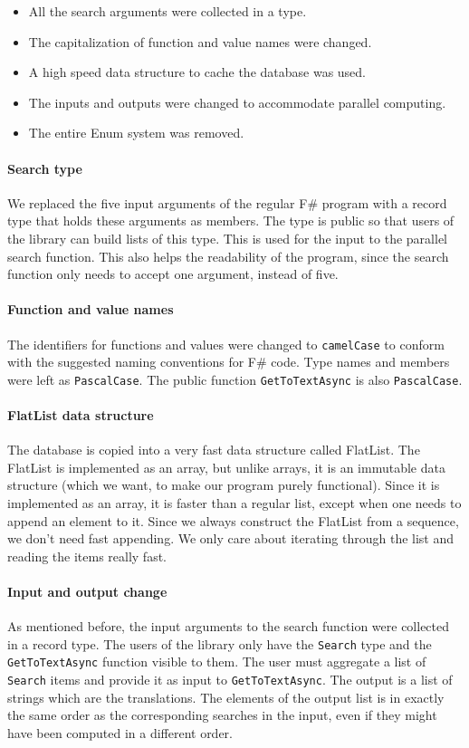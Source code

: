\documentclass[12pt, a4paper]{article}
\newcommand{\code}[1]{{\small \texttt{#1}}}
\begin{document}
\begin{itemize}
	\item All the search arguments were collected in a type.
	\item The capitalization of function and value names were changed.
	\item A high speed data structure to cache the database was used.
	\item The inputs and outputs were changed to accommodate parallel computing.
	\item The entire Enum system was removed.
\end{itemize}

\paragraph{Search type} We replaced the five input arguments of the regular F\# program with a record type that holds these arguments as members. The type is public so that users of the library can build lists of this type. This is used for the input to the parallel search function. This also helps the readability of the program, since the search function only needs to accept one argument, instead of five.

\paragraph{Function and value names} The identifiers for functions and values were changed to \code{camelCase} to conform with the suggested naming conventions for F\# code. Type names and members were left as \code{PascalCase}. The public function \code{GetToTextAsync} is also \code{PascalCase}.

\paragraph{FlatList data structure} The database is copied into a very fast data structure called FlatList. The FlatList is implemented as an array, but unlike arrays, it is an immutable data structure (which we want, to make our program purely functional). Since it is implemented as an array, it is faster than a regular list, except when one needs to append an element to it. Since we always construct the FlatList from a sequence, we don't need fast appending. We only care about iterating through the list and reading the items really fast.

\paragraph{Input and output change} As mentioned before, the input arguments to the search function were collected in a record type. The users of the library only have the \code{Search} type and the \code{GetToTextAsync} function visible to them. The user must aggregate a list of \code{Search} items and provide it as input to \code{GetToTextAsync}. The output is a list of strings which are the translations. The elements of the output list is in exactly the same order as the corresponding searches in the input, even if they might have been computed in a different order.
\end{document}
